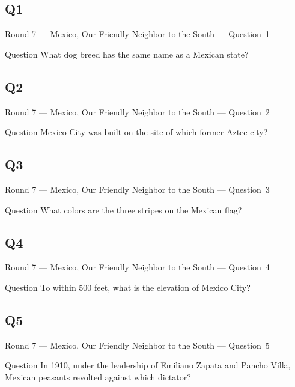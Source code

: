 \documentclass[11pt]{beamer}
\begin{document}
\subsection*{Q1}
\begin{frame}[t]{Round 7 --- Mexico, Our Friendly Neighbor to the South --- \mbox{Question 1}}
\vspace{-0.5em}
\begin{block}{Question}
What dog breed has the same name as a Mexican state?
\end{block}
\end{frame}
\subsection*{Q2}
\begin{frame}[t]{Round 7 --- Mexico, Our Friendly Neighbor to the South --- \mbox{Question 2}}
\vspace{-0.5em}
\begin{block}{Question}
Mexico City was built on the site of which former Aztec city?
\end{block}
\end{frame}
\subsection*{Q3}
\begin{frame}[t]{Round 7 --- Mexico, Our Friendly Neighbor to the South --- \mbox{Question 3}}
\vspace{-0.5em}
\begin{block}{Question}
What colors are the three stripes on the Mexican flag?
\end{block}
\end{frame}
\subsection*{Q4}
\begin{frame}[t]{Round 7 --- Mexico, Our Friendly Neighbor to the South --- \mbox{Question 4}}
\vspace{-0.5em}
\begin{block}{Question}
To within 500 feet, what is the elevation of Mexico City?
\end{block}
\end{frame}
\subsection*{Q5}
\begin{frame}[t]{Round 7 --- Mexico, Our Friendly Neighbor to the South --- \mbox{Question 5}}
\vspace{-0.5em}
\begin{block}{Question}
In 1910, under the leadership of Emiliano Zapata and Pancho Villa, Mexican peasants revolted against which dictator?
\end{block}
\end{frame}
\end{document}
